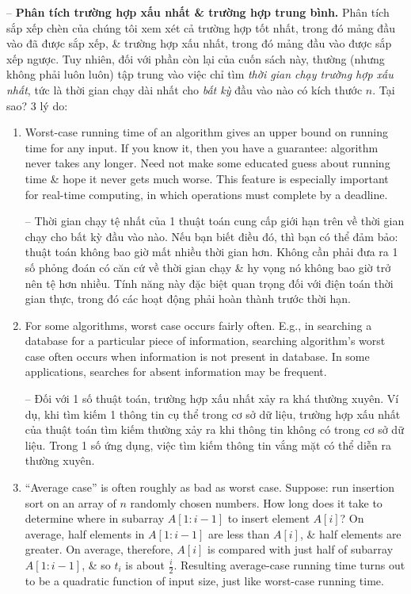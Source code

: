 \documentclass{article}
\begin{document}
\begin{itemize}
\begin{itemize}
\begin{itemize}
            -- {\bf Phân tích trường hợp xấu nhất \& trường hợp trung bình.} Phân tích sắp xếp chèn của chúng tôi xem xét cả trường hợp tốt nhất, trong đó mảng đầu vào đã được sắp xếp, \& trường hợp xấu nhất, trong đó mảng đầu vào được sắp xếp ngược. Tuy nhiên, đối với phần còn lại của cuốn sách này, thường (nhưng không phải luôn luôn) tập trung vào việc chỉ tìm {\it thời gian chạy trường hợp xấu nhất}, tức là thời gian chạy dài nhất cho {\it bất kỳ} đầu vào nào có kích thước $n$. Tại sao? 3 lý do:
            \begin{enumerate}
                \item Worst-case running time of an algorithm gives an upper bound on running time for any input. If you know it, then you have a guarantee: algorithm never takes any longer. Need not make some educated guess about running time \& hope it never gets much worse. This feature is especially important for real-time computing, in which operations must complete by a deadline.
                
                -- Thời gian chạy tệ nhất của 1 thuật toán cung cấp giới hạn trên về thời gian chạy cho bất kỳ đầu vào nào. Nếu bạn biết điều đó, thì bạn có thể đảm bảo: thuật toán không bao giờ mất nhiều thời gian hơn. Không cần phải đưa ra 1 số phỏng đoán có căn cứ về thời gian chạy \& hy vọng nó không bao giờ trở nên tệ hơn nhiều. Tính năng này đặc biệt quan trọng đối với điện toán thời gian thực, trong đó các hoạt động phải hoàn thành trước thời hạn.
                \item For some algorithms, worst case occurs fairly often. E.g., in searching a database for a particular piece of information, searching algorithm's worst case often occurs when information is not present in database. In some applications, searches for absent information may be frequent.
                
                -- Đối với 1 số thuật toán, trường hợp xấu nhất xảy ra khá thường xuyên. Ví dụ, khi tìm kiếm 1 thông tin cụ thể trong cơ sở dữ liệu, trường hợp xấu nhất của thuật toán tìm kiếm thường xảy ra khi thông tin không có trong cơ sở dữ liệu. Trong 1 số ứng dụng, việc tìm kiếm thông tin vắng mặt có thể diễn ra thường xuyên.
                \item ``Average case'' is often roughly as bad as worst case. Suppose: run insertion sort on an array of $n$ randomly chosen numbers. How long does it take to determine where in subarray $A[1:i - 1]$ to insert element $A[i]$? On average, half elements in $A[1:i - 1]$ are less than $A[i]$, \& half elements are greater. On average, therefore, $A[i]$ is compared with just half of subarray $A[1:i - 1]$, \& so $t_i$ is about $\frac{i}{2}$. Resulting average-case running time turns out to be a quadratic function of input size, just like worst-case running time.
                

\end{enumerate}
\end{itemize}
\end{itemize}
\end{itemize}
\end{document}
